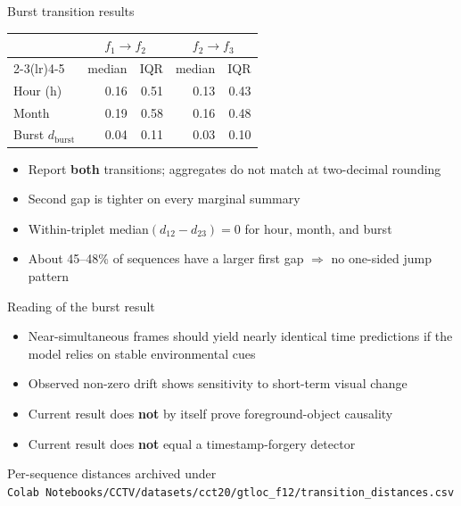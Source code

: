 \documentclass[aspectratio=169,11pt]{beamer}
\begin{document}
\begin{frame}{Burst transition results}
\begin{center}
\footnotesize
\renewcommand{\arraystretch}{1.3}
\begin{tabular}{lrrrr}
\toprule
& \multicolumn{2}{c}{\textbf{$f_1\!\rightarrow\!f_2$}}
& \multicolumn{2}{c}{\textbf{$f_2\!\rightarrow\!f_3$}} \\
\cmidrule(lr){2-3}\cmidrule(lr){4-5}
& median & IQR & median & IQR \\
\midrule
Hour (h)  & 0.16 & 0.51 & 0.13 & 0.43 \\
Month     & 0.19 & 0.58 & 0.16 & 0.48 \\
Burst $d_{\mathrm{burst}}$ & 0.04 & 0.11 & 0.03 & 0.10 \\
\bottomrule
\end{tabular}
\end{center}
\vspace{0.7em}
\normalsize
\begin{itemize}
  \item Report \textbf{both} transitions; aggregates do not match at two-decimal rounding
  \item Second gap is tighter on every marginal summary
  \item Within-triplet median$(d_{12}-d_{23})=0$ for hour, month, and burst
  \item About 45--48\% of sequences have a larger first gap $\Rightarrow$ no one-sided jump pattern
\end{itemize}
\end{frame}

\begin{frame}{Reading of the burst result}
\begin{itemize}
  \item Near-simultaneous frames should yield nearly identical time predictions if the model relies on stable environmental cues
  \item Observed non-zero drift shows sensitivity to short-term visual change
  \item Current result does \textbf{not} by itself prove foreground-object causality
  \item Current result does \textbf{not} equal a timestamp-forgery detector
\end{itemize}
\vspace{0.5em}
{\footnotesize\color{muted}
Per-sequence distances archived under\\
\texttt{Colab Notebooks/CCTV/datasets/cct20/gtloc\_f12/transition\_distances.csv}}
\end{frame}
\end{document}
